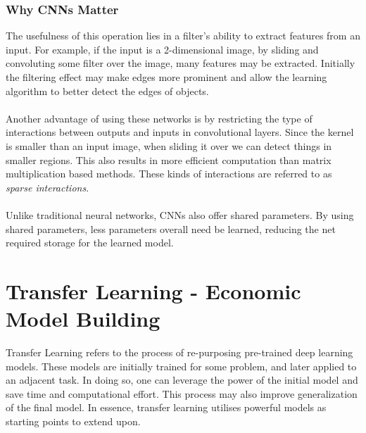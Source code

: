 \subsubsection{Why CNNs Matter}
The usefulness of this operation lies in a filter's ability to extract features from an input. For example, if the input is a 2-dimensional image, by sliding and convoluting some filter over the image, many features may be extracted. Initially the filtering effect may make edges more prominent and allow the learning algorithm to better detect the edges of objects.\\ \\
Another advantage of using these networks is by restricting the type of interactions between outputs and inputs in convolutional layers. Since the kernel is smaller than an input image, when sliding it over we can detect things in smaller regions. This also results in more efficient computation than matrix multiplication based methods. These kinds of interactions are referred to as \textit{sparse interactions}.\\ \\
Unlike traditional neural networks, CNNs also offer shared parameters. By using shared parameters, less parameters overall need be learned, reducing the net required storage for the learned model.



\section{Transfer Learning - Economic Model Building}
Transfer Learning refers to the process of re-purposing pre-trained deep learning models. These models are initially trained for some problem, and later applied to an adjacent task. In doing so, one can leverage the power of the initial model and save time and computational effort. This process may also improve generalization of the final model. In essence, transfer learning utilises powerful models as starting points to extend upon. 

